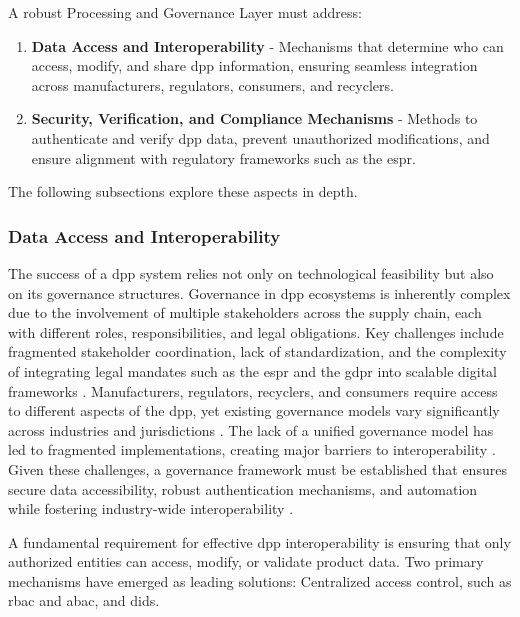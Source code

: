 A robust Processing and Governance Layer must address:

\begin{enumerate}[itemsep=0.5\baselineskip]
    \item \textbf{Data Access and Interoperability} - Mechanisms that determine who can access, modify, and share \ac{dpp} information, ensuring seamless integration across manufacturers, regulators, consumers, and recyclers. \autocite{Ducuing.2023}
    \item \textbf{Security, Verification, and Compliance Mechanisms} - Methods to authenticate and verify \ac{dpp} data, prevent unauthorized modifications, and ensure alignment with regulatory frameworks such as the \ac{espr}. \autocite{EuropeanParliamentandCouncil.2024, Pietron.2023}
\end{enumerate}

The following subsections explore these aspects in depth.

\subsubsection*{Data Access and Interoperability}
The success of a \ac{dpp} system relies not only on technological feasibility but also on its governance structures. Governance in \ac{dpp} ecosystems is inherently complex due to the involvement of multiple stakeholders across the supply chain, each with different roles, responsibilities, and legal obligations. Key challenges include fragmented stakeholder coordination, lack of standardization, and the complexity of integrating legal mandates such as the \ac{espr} and the \ac{gdpr} into scalable digital frameworks \autocite{EuropeanParliamentandCouncil.2016, Pietron.2023}. Manufacturers, regulators, recyclers, and consumers require access to different aspects of the \ac{dpp}, yet existing governance models vary significantly across industries and jurisdictions \autocite{Ducuing.2023}. The lack of a unified governance model has led to fragmented implementations, creating major barriers to interoperability \autocite{Pourjafarian.2023}. Given these challenges, a governance framework must be established that ensures secure data accessibility, robust authentication mechanisms, and automation while fostering industry-wide interoperability \autocite{Jensen.2024}.

A fundamental requirement for effective \ac{dpp} interoperability is ensuring that only authorized entities can access, modify, or validate product data. Two primary mechanisms have emerged as leading solutions: Centralized access control, such as \ac{rbac} and \ac{abac}, and \ac{did}s. 

